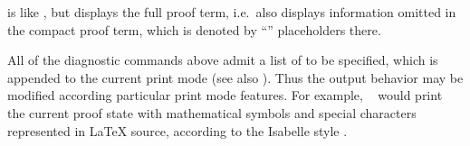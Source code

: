 \begin{isabellebody}
\begin{isamarkuptext}
\begin{descr}
  \item [\mbox{\isa{\isacommand{full{\isacharunderscore}prf}}}] is like \mbox{}, but displays
  the full proof term, i.e.\ also displays information omitted in the
  compact proof term, which is denoted by ``\isa{{\isacharunderscore}}'' placeholders
  there.

  \end{descr}

  All of the diagnostic commands above admit a list of 
  to be specified, which is appended to the current print mode (see
  also \cite{isabelle-ref}).  Thus the output behavior may be modified
  according particular print mode features.  For example, \mbox{}~ would print the current
  proof state with mathematical symbols and special characters
  represented in {\LaTeX} source, according to the Isabelle style
  \cite{isabelle-sys}.


\end{isamarkuptext}
\end{isabellebody}
